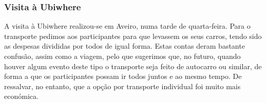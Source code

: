 
\subsubsection{Visita à Ubiwhere}

A visita à Ubiwhere realizou-se em Aveiro, numa tarde de quarta-feira. Para o transporte pedimos aos participantes para que levassem os seus carros, tendo sido as despesas divididas por todos de igual forma. Estas contas deram bastante confusão, assim como a viagem, pelo que sugerimos que, no futuro, quando houver algum evento deste tipo o transporte seja feito de autocarro ou similar, de forma a que os participantes possam ir todos juntos e ao mesmo tempo. De ressalvar, no entanto, que a opção por transporte individual foi muito mais económica.